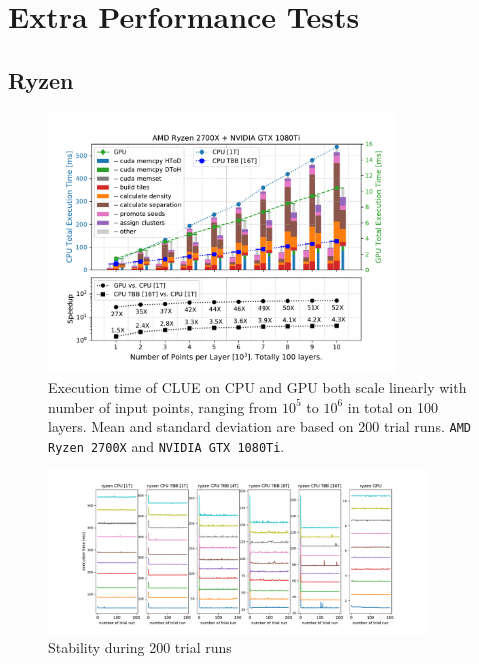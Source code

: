


\section{Extra Performance Tests}




\subsection{Ryzen}
\begin{figure}[ht!]
    \centering
    \includegraphics[width=0.82\textwidth]{chapters/HGCal/figures/clue/private/Figure5_1.pdf}
    \caption{Execution time of CLUE on CPU and GPU both scale linearly with number of input points, ranging from $10^5$ to $10^6$ in total on 100 layers. Mean and standard deviation are based on 200 trial runs. \texttt{AMD Ryzen 2700X} and \texttt{NVIDIA GTX 1080Ti}.}
\end{figure}
\begin{figure}[ht!]
    \centering
    \includegraphics[trim=3cm 0cm 3cm 0cm, clip,width=0.9\textwidth]{chapters/HGCal/figures/clue/private/addition_ryzen.pdf}
    \caption{Stability during 200 trial runs}
\end{figure}

